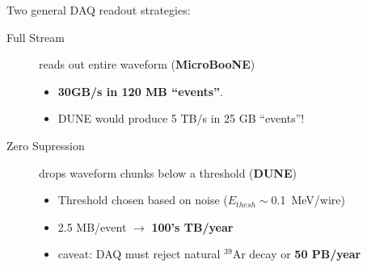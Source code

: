 \documentclass[xcolor=dvipsnames]{beamer}
\begin{document}
\begin{frame}
  \footnotesize
  Two general DAQ readout strategies:
  \begin{description}
  \item[Full Stream] reads out entire waveform (\textbf{MicroBooNE})
    \begin{itemize}
    \item \textbf{30GB/s in 120 MB ``events''}.
    \item DUNE would produce 5 TB/s in 25 GB ``events''!
    \end{itemize}
  \item[Zero Supression] drops waveform chunks below a threshold (\textbf{DUNE})
    \begin{itemize}
    \item Threshold chosen based on noise ($E_{thesh} \sim$\SI{0.1}{\mega\electronvolt}/wire)
    \item 2.5 MB/event $\rightarrow$ \textbf{100's TB/year}
    \item caveat: DAQ must reject natural $^{39}$Ar decay or \textbf{50 PB/year}
    \end{itemize}
  \end{description}

\end{frame}
\end{document}
